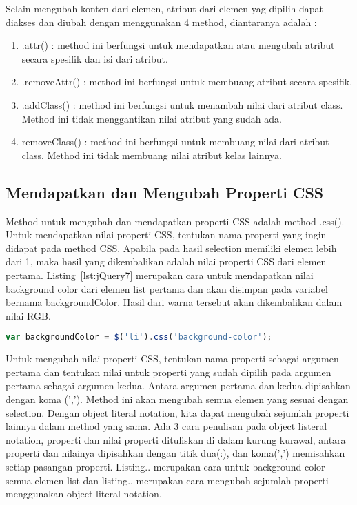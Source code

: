 Selain mengubah konten dari elemen, atribut dari elemen yag dipilih dapat diakses dan diubah dengan menggunakan 4 method, diantaranya adalah :

\begin{enumerate}
	\item .attr() : method ini berfungsi untuk mendapatkan atau mengubah atribut secara spesifik dan isi dari atribut.
	\item .removeAttr() : method ini berfungsi untuk membuang atribut secara spesifik.
	\item .addClass() : method ini berfungsi untuk menambah nilai dari atribut class. Method ini tidak menggantikan nilai atribut yang sudah ada.
	\item removeClass() : method ini berfungsi untuk membuang nilai dari atribut class. Method ini tidak membuang nilai atribut kelas lainnya.
\end{enumerate}

\subsection{Mendapatkan dan Mengubah Properti CSS}
Method untuk mengubah dan mendapatkan properti CSS adalah method .css(). Untuk mendapatkan nilai properti CSS, tentukan nama properti yang ingin didapat pada method CSS. Apabila pada hasil selection memiliki elemen lebih dari 1, maka hasil yang dikembalikan adalah nilai properti CSS dari elemen pertama. Listing~\ref{lst:jQuery7} merupakan cara untuk mendapatkan nilai background color dari elemen list pertama dan akan disimpan pada variabel bernama backgroundColor. Hasil dari warna tersebut akan dikembalikan dalam nilai RGB. 

\begin{lstlisting}[language=Javascript, caption=Mendapatkan nilai warna background color dari elemen list pertama, label={lst:jQuery7}]
	var backgroundColor = $('li').css('background-color');
\end{lstlisting}

Untuk mengubah nilai properti CSS, tentukan nama properti sebagai argumen pertama dan tentukan nilai untuk properti yang sudah dipilih pada argumen pertama sebagai argumen kedua. Antara argumen pertama dan kedua dipisahkan dengan koma (','). Method ini akan mengubah semua elemen yang sesuai dengan selection. Dengan object literal notation, kita dapat mengubah sejumlah properti lainnya dalam method yang sama. Ada 3 cara penulisan pada object listeral notation, properti dan nilai properti dituliskan di dalam kurung kurawal, antara properti dan nilainya dipisahkan dengan titik dua(:), dan koma(',') memisahkan setiap pasangan properti. Listing.. merupakan cara untuk background color semua elemen list dan listing.. merupakan cara mengubah sejumlah properti menggunakan object literal notation.

